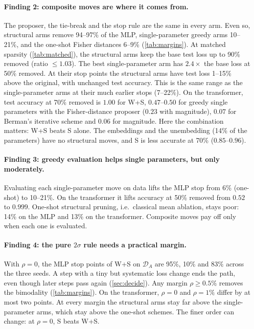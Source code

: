 \documentclass[11pt,a4paper]{article}
\theoremstyle{definition}
\newcommand{\D}{\mathcal{D}}
\newcommand{\DA}{\D_{A}}
\newcommand{\WS}{\textsf{W+S}}
\newcommand{\So}{\textsf{S}}
\begin{document}
\paragraph{Finding 2: composite moves are where it comes from.} The proposer, the
tie-break and the stop rule are the same in every arm. Even so, structural arms remove
94--97\% of the MLP, single-parameter greedy arms 10--21\%, and the one-shot Fisher
distances 6--9\% (\cref{tab:margins}). At matched sparsity (\cref{tab:matched}), the
structural arms keep the base test loss up to 90\% removed (ratio $\le1.03$). The best
single-parameter arm has $2.4\times$ the base loss at 50\% removed. At their stop points the structural arms have test loss 1--15\% above the original, with
unchanged test accuracy. This is the same range as the single-parameter arms at their much
earlier stops (7--22\%). On the transformer, test accuracy at 70\% removed is $1.00$ for \WS, $0.47$--$0.50$ for greedy single
parameters with the Fisher-distance proposer ($0.23$ with magnitude), $0.07$ for Berman's iterative scheme and $0.06$ for magnitude. Here the
combination matters: \WS{} beats \So{} alone. The embeddings and the unembedding (14\% of
the parameters) have no structural moves, and \So{} is less accurate at 70\% ($0.85$--$0.96$).

\paragraph{Finding 3: greedy evaluation helps single parameters, but only moderately.}
Evaluating each single-parameter move on data lifts the MLP stop from 6\% (one-shot) to
10--21\%. On the transformer it lifts accuracy at 50\% removed from $0.52$ to $0.999$.
One-shot structural pruning, i.e.\ classical mean ablation, stays poor: 14\% on the
MLP and 13\% on the transformer. Composite moves pay off only when each one is
evaluated.

\paragraph{Finding 4: the pure $2\sigma$ rule needs a practical margin.} With $\rho=0$,
the MLP stop points of \WS{} on $\DA$ are 95\%, 10\% and 83\% across the three seeds.
A step with a tiny but systematic loss change ends the path, even though later steps
pass again (\cref{sec:decide}). Any margin $\rho\ge0.5\%$ removes the bimodality
(\cref{tab:margins}). On the transformer, $\rho=0$ and $\rho=1\%$ differ by at most two points. At every
margin the structural arms stay far above the single-parameter arms, which stay above
the one-shot schemes. The finer order can change: at $\rho=0$, \So{} beats \WS.
\end{document}
